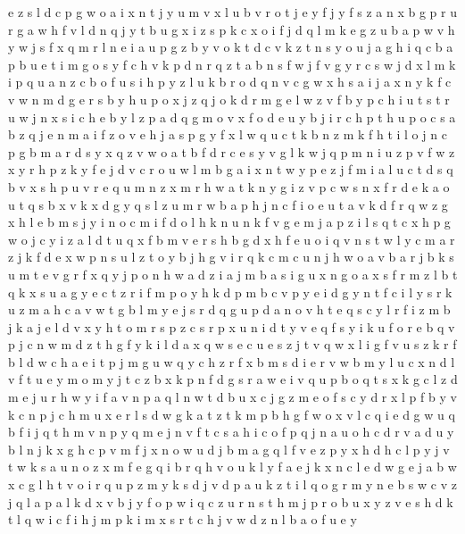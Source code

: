 \documentclass{article}
\begin{document}
e z s l d c p g w o a i x n t j y u m v
x l u b v r o t j e y f
j y f
s z a n x b g p r
u
r g
a w h f v l d n q j y t b u g x i z s p k
c x o i f j d q l m k e g z u b a p w v h y
w j s f x q m r l n e i a u p g z b y v o k t d c
v k z t n s y o u j a g h i q c b
a p
b u e t i m g o s y f c h v k p d n r
q z t a b n s f w j
f v g y r c s w j d x l m k i p q u a
n z c b o f u s i
h p
y z l u k b r o d q n v c g w x h s a i j
a x n y
k f c v w n m d g e r s b y h u p o x j z
q j o k d r m g e l w z v f b y p c h i u t s
t r u w j n x s i c h e b y l z p a d q g m o v
x f o d e u y b j i r c h p t
h u p o c s a b z q
j e n m a i f z
o v e h j a s p g y f x l w q u c t k b n z m
k f h t i l o j n c p g b m a r d s y x q z v w
o a t b f d r c e s y v g l k w j q p m n i u z
p v f w z x y r
h p z k y f e j d v c r o u w l m b g a i x n t
w y p e z j f m i a l u c t d s q b v x
s h p u
v r e q u m n z
x m r h w a t k n
y g i z v p c w s n x f r d e k a o u t q
s b x
v k x d g y q s l z u m r w b a p h j n c f i o e
u t a v k d f r q w z g x h l e b m s j y i n o c
m i f d o l h k n
u n k f v g e m j a p z i l s q t c x
h p
g w o j c y i z a l d t u q x f b m v e r s h
b g d x h f e u o i q v n s t w l y c m a r z j k
f d e x w p n s u l z t o y b j h g v i r q k c m
c u n j h w o a v b
a r j
b k s u m t e v g r f x q y j p o n h w a d z i
a j
m b a s i g u
x n g o
a x s
f r m z l b t q k x s u a g y e c
t z r i f m p
o y h k d p m
b c v p y e
i d g y n t f c
i l y s r k u z m a h
c a
v w t g b l m y e j s r d q
g u p d a n o v h t e q s c y l r f i z m b j k
a j e l d v x y h t o m r s p
z c s r p x u n i d t y v e q f
s y i k u f o r e b q v p j c n w m d z t h g
f y k i l d a x q w s e
c u e s z j t v q w x l i g f
v u s z k r f b l d w c h a e i t p j m
g u w q y c h z r f x b m s d i e
r v w b m
y l u c x n d
l v f t u e y m
o m y j t c z b x k p n f d g s r a w e i v q u
p b o q t s x k g c l z d m e j u r h w y i f a v n
p a q l n w t d b u x c j g
z m e o f s c y
d r x l p f b y v k c n
p j c h m u x e r l s d w g k a t
z t k m p b h g f w o x v l c q i e
d g w
u q b f
i j q t h m v n
p y q m
e j n v f t c s a
h i c o f p q j n a u
o h c d
r v a d u y b l n j k x g h c
p v m f j x
n o w u d j b m a g q l f v e z p y x h
d h c l p y j v t w k s a u n o z x m f e g q i b r
q h v o u k l y f a e j
k x n c l e d w g
e j a b w x c g l h t v o i r q u p z m y k s d
j v d p a u k z t i l q o g r m y n e b s w c
v z j q l a p
a l k d x v b j y f o p w i q c z u r n s t h
m j p r o b u x y z v e s h d k t l q w i c f
i h j m
p k i m x s r t c h j v w d z n l b a o f u e y
\end{document}
